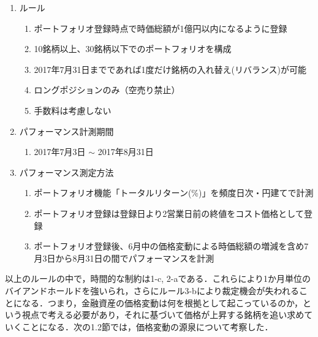 \documentclass[11pt]{jreport}
\begin{document}
\begin{enumerate}
\item ルール
\begin{enumerate}
\item ポートフォリオ登録時点で時価総額が1億円以内になるように登録
\item 10銘柄以上、30銘柄以下でのポートフォリオを構成
\item 2017年7月31日までであれば1度だけ銘柄の入れ替え(リバランス)が可能
\item ロングポジションのみ（空売り禁止）
\item 手数料は考慮しない
\end{enumerate}

\item パフォーマンス計測期間
\begin{enumerate}
\item  2017年7月3日 $\sim$ 2017年8月31日
\end{enumerate}

\item パフォーマンス測定方法
\begin{enumerate}
\item ポートフォリオ機能「トータルリターン(\%)」を頻度日次・円建てで計測
\item ポートフォリオ登録は登録日より2営業日前の終値をコスト価格として登録
\item ポートフォリオ登録後、6月中の価格変動による時価総額の増減を含め7月3日から8月31日の間でパフォーマンスを計測
\end{enumerate}
\end{enumerate}

以上のルールの中で，時間的な制約は1-c, 2-aである．これらにより1か月単位のバイアンドホールドを強いられ，さらにルール3-bにより裁定機会が失われることになる．つまり，金融資産の価格変動は何を根拠として起こっているのか，という視点で考える必要があり，それに基づいて価格が上昇する銘柄を追い求めていくことになる．次の1.2節では，価格変動の源泉について考察した．
\end{document}
